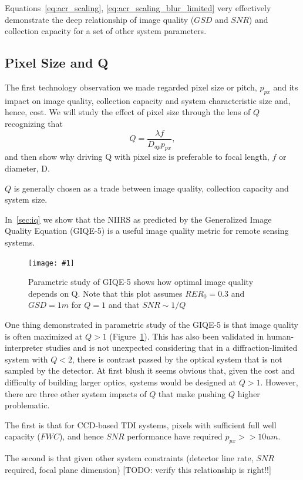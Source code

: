 \documentclass[10pt,journal]{IEEEtran}  %
\newcommand{\includefigure}[3]
{
  \begin{figure}[h!]
  \centering
  \texttt{[image: \#1]}
  \caption[]{#3}
  \label{#2}
  \end{figure}
}
\begin{document}
Equations~\eqref{eq:acr_scaling}, \eqref{eq:acr_scaling_blur_limited} very effectively demonstrate the deep relationship of image quality ($GSD$ and $SNR$) and collection capacity for a set of other system parameters.

\subsection{Pixel Size and Q}

The first technology observation we made regarded pixel size or pitch, $p_{px}$ and its impact on image quality, collection capacity and system characteristic size and, hence, cost.  We will study the effect of pixel size through the lens of $Q$ recognizing that
\begin{equation*}
    Q = \frac{\lambda f}{D_{ap} p_{px}},
\end{equation*}
and then show why driving Q with pixel size is preferable to focal length, $f$ or diameter, D.

$Q$ is generally chosen as a trade between image quality, collection capacity and system size.  

In~\ref{sec:iq} we show that the NIIRS as predicted by the Generalized Image Quality Equation (GIQE-5) is a useful image quality metric for remote sensing systems.

\includefigure{figures/Q_iq.pgf}{fig:q_iq}{Parametric study of GIQE-5 shows how optimal image quality depends on Q.  Note that this plot assumes $RER_0 = 0.3$ and $GSD = 1m$ for $Q=1$ and that $SNR \sim 1 / Q$}

One thing demonstrated in parametric study of the GIQE-5 is that image quality is often maximized at $Q>1$ (Figure~\ref{fig:q_iq}).  This has also been validated in human-interpreter studies \cite{fiete_Q_IQ} and is not unexpected considering that in a diffraction-limited system with $Q<2$, there is contrast passed by the optical system that is not sampled by the detector.  At first blush it seems obvious that, given the cost and difficulty of building larger optics, systems would be designed at $Q>1$.  However, there are three other system impacts of $Q$ that make pushing $Q$ higher problematic.

The first is that for CCD-based TDI systems, pixels with sufficient full well capacity ($FWC$), and hence $SNR$ performance have required $p_{px} >> 10um$.

The second is that given other system constraints (detector line rate, $SNR$ required, focal plane dimension) [TODO: verify this relationship is right!!]
\end{document}
